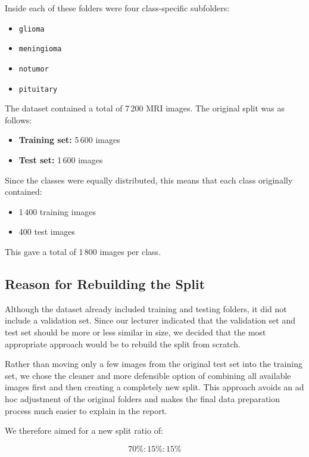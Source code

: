 \documentclass{article}
\begin{document}
Inside each of these folders were four class-specific subfolders:

\begin{itemize}
    \item \texttt{glioma}
    \item \texttt{meningioma}
    \item \texttt{notumor}
    \item \texttt{pituitary}
\end{itemize}

The dataset contained a total of 7\,200 MRI images. The original split was as follows:

\begin{itemize}
    \item \textbf{Training set:} 5\,600 images
    \item \textbf{Test set:} 1\,600 images
\end{itemize}

Since the classes were equally distributed, this means that each class originally contained:

\begin{itemize}
    \item 1\,400 training images
    \item 400 test images
\end{itemize}

This gave a total of 1\,800 images per class.

\subsection{Reason for Rebuilding the Split}

Although the dataset already included training and testing folders, it did not include a validation set. Since our lecturer indicated that the validation set and test set should be more or less similar in size, we decided that the most appropriate approach would be to rebuild the split from scratch.

Rather than moving only a few images from the original test set into the training set, we chose the cleaner and more defensible option of combining all available images first and then creating a completely new split. This approach avoids an ad hoc adjustment of the original folders and makes the final data preparation process much easier to explain in the report.

We therefore aimed for a new split ratio of:

\[
70\% : 15\% : 15\%
\]
\end{document}
